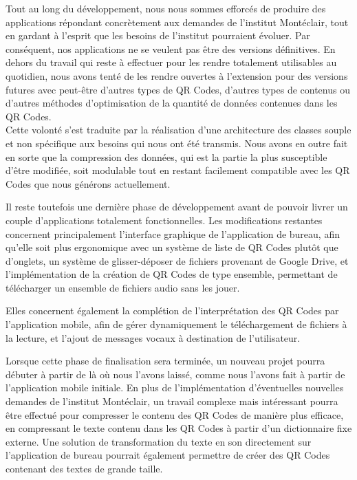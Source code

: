 \par
Tout au long du développement, nous nous sommes efforcés de produire des applications répondant concrètement aux demandes de l'institut Montéclair, tout en gardant à l'esprit que les besoins de l'institut pourraient évoluer. Par conséquent, nos applications ne se veulent pas être des versions définitives. En dehors du travail qui reste à effectuer pour les rendre totalement utilisables au quotidien, nous avons tenté de les rendre ouvertes à l'extension pour des versions futures avec peut-être d'autres types de QR Codes, d'autres types de contenus ou d'autres méthodes d'optimisation de la quantité de données contenues dans les QR Codes.\\
Cette volonté s'est traduite par la réalisation d'une architecture des classes souple et non spécifique aux besoins qui nous ont été transmis. Nous avons en outre fait en sorte que la compression des données, qui est la partie la plus susceptible d'être modifiée, soit modulable tout en restant facilement compatible avec les QR Codes que nous générons actuellement.\\

\par
Il reste toutefois une dernière phase de développement avant de pouvoir livrer un couple d'applications totalement fonctionnelles. Les modifications restantes concernent principalement l'interface graphique de l'application de bureau, afin qu'elle soit plus ergonomique avec un système de liste de QR Codes plutôt que d'onglets, un système de glisser-déposer de fichiers provenant de Google Drive, et l'implémentation de la création de QR Codes de type ensemble, permettant de télécharger un ensemble de fichiers audio sans les jouer.
\par
Elles concernent également la complétion de l'interprétation des QR Codes par l'application mobile, afin de gérer dynamiquement le téléchargement de fichiers à la lecture, et l'ajout de messages vocaux à destination de l'utilisateur.\\

\par
Lorsque cette phase de finalisation sera terminée, un nouveau projet pourra débuter à partir de là où nous l'avons laissé, comme nous l'avons fait à partir de l'application mobile initiale. En plus de l'implémentation d'éventuelles nouvelles demandes de l'institut Montéclair, un travail complexe mais intéressant pourra être effectué pour compresser le contenu des QR Codes de manière plus efficace, en compressant le texte contenu dans les QR Codes à partir d'un dictionnaire fixe externe. Une solution de transformation du texte en son directement sur l'application de bureau pourrait également permettre de créer des QR Codes contenant des textes de grande taille.